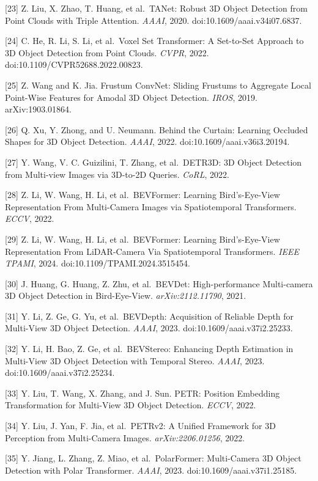 {[}23{]} Z. Liu, X. Zhao, T. Huang, et al.~TANet: Robust 3D Object Detection from Point Clouds with Triple Attention. \emph{AAAI}, 2020. doi:10.1609/aaai.v34i07.6837.

{[}24{]} C. He, R. Li, S. Li, et al.~Voxel Set Transformer: A Set-to-Set Approach to 3D Object Detection from Point Clouds. \emph{CVPR}, 2022. doi:10.1109/CVPR52688.2022.00823.

{[}25{]} Z. Wang and K. Jia. Frustum ConvNet: Sliding Frustums to Aggregate Local Point-Wise Features for Amodal 3D Object Detection. \emph{IROS}, 2019. arXiv:1903.01864.

{[}26{]} Q. Xu, Y. Zhong, and U. Neumann. Behind the Curtain: Learning Occluded Shapes for 3D Object Detection. \emph{AAAI}, 2022. doi:10.1609/aaai.v36i3.20194.

{[}27{]} Y. Wang, V. C. Guizilini, T. Zhang, et al.~DETR3D: 3D Object Detection from Multi-view Images via 3D-to-2D Queries. \emph{CoRL}, 2022.

{[}28{]} Z. Li, W. Wang, H. Li, et al.~BEVFormer: Learning Bird's-Eye-View Representation From Multi-Camera Images via Spatiotemporal Transformers. \emph{ECCV}, 2022.

{[}29{]} Z. Li, W. Wang, H. Li, et al.~BEVFormer: Learning Bird's-Eye-View Representation From LiDAR-Camera Via Spatiotemporal Transformers. \emph{IEEE TPAMI}, 2024. doi:10.1109/TPAMI.2024.3515454.

{[}30{]} J. Huang, G. Huang, Z. Zhu, et al.~BEVDet: High-performance Multi-camera 3D Object Detection in Bird-Eye-View. \emph{arXiv:2112.11790}, 2021.

{[}31{]} Y. Li, Z. Ge, G. Yu, et al.~BEVDepth: Acquisition of Reliable Depth for Multi-View 3D Object Detection. \emph{AAAI}, 2023. doi:10.1609/aaai.v37i2.25233.

{[}32{]} Y. Li, H. Bao, Z. Ge, et al.~BEVStereo: Enhancing Depth Estimation in Multi-View 3D Object Detection with Temporal Stereo. \emph{AAAI}, 2023. doi:10.1609/aaai.v37i2.25234.

{[}33{]} Y. Liu, T. Wang, X. Zhang, and J. Sun. PETR: Position Embedding Transformation for Multi-View 3D Object Detection. \emph{ECCV}, 2022.

{[}34{]} Y. Liu, J. Yan, F. Jia, et al.~PETRv2: A Unified Framework for 3D Perception from Multi-Camera Images. \emph{arXiv:2206.01256}, 2022.

{[}35{]} Y. Jiang, L. Zhang, Z. Miao, et al.~PolarFormer: Multi-Camera 3D Object Detection with Polar Transformer. \emph{AAAI}, 2023. doi:10.1609/aaai.v37i1.25185.

